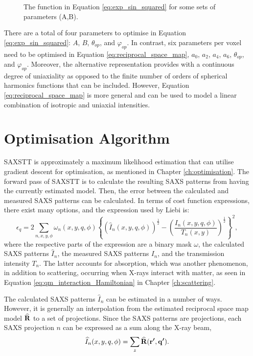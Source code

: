 \begin{figure}
    \centering
    
    \caption{The function in Equation \eqref{eq:exp_sin_squared} for some sets of parameters (A,B).}
    \label{fig:exp_sin_squared}
\end{figure}

There are a total of four parameters to optimise in Equation \eqref{eq:exp_sin_squared}: $A$, $B$, $\theta_{op}$, and $\varphi_{op}$.
In contrast, six parameters per voxel need to be optimised in Equation \eqref{eq:reciprocal_space_map},
$a_{0}$, $a_{2}$, $a_{4}$, $a_{6}$, $\theta_{op}$, and $\varphi_{op}$.
Moreover, the alternative representation provides with a continuous degree of uniaxiality
as opposed to the finite number of orders of spherical harmonics functions that can be included.
However, Equation \eqref{eq:reciprocal_space_map} is more general and can be used to model a linear combination of isotropic and uniaxial intensities.


\section{Optimisation Algorithm}

SAXSTT is approximately a maximum likelihood estimation that can utilise gradient descent for optimisation, as mentioned in Chapter \ref{ch:optimisation}.
The forward pass of SAXSTT is to calculate the resulting SAXS patterns from having the currently estimated model.
Then, the error between the calculated and measured SAXS patterns can be calculated.
In terms of cost function expressions, there exist many options, and the expression used by Liebi \cite{liebi2018small} is:
\begin{equation}
    \epsilon_{q} = 2 \sum_{n, x, y, \phi} \omega_{n}(x,y,q,\phi) \left\{ \left( \widehat{I}_{n}(x,y,q,\phi) \right)^{\frac{1}{2}}  -  \left( \frac{ I_{n}(x,y,q,\phi) }{T_{n}(x,y)} \right)^{\frac{1}{2}} \right\}^{2},
\end{equation}
\noindent
where the respective parts of the expression are a binary mask $\omega$, the calculated SAXS patterns $\widehat{I}_{n}$, the measured SAXS patterns $I_{n}$, and the transmission intensity $T_{n}$.
The latter accounts for absorption, which was another phenomenon, in addition to scattering, occurring when X-rays interact with matter,
as seen in Equation \eqref{eq:qm_interaction_Hamiltonian} in Chapter \ref{ch:scattering}.

The calculated SAXS patterns $\widehat{I}_{n}$ can be estimated in a number of ways.
However, it is generally an interpolation from the estimated reciprocal space map model $\bm{\mathrm{\widehat{R}}}$ to a set of projections.
Since the SAXS patterns are projections, each SAXS projection $n$ can be expressed as a sum along the X-ray beam,
\begin{equation}\label{eq:SAXS_intensity}
    \widehat{I}_{n}(x,y,q,\phi) = \sum_{z} \bm{\widehat{\mathrm{R}}}(\bm{\mathrm{r'}}, \bm{\mathrm{q'}}).
\end{equation}

